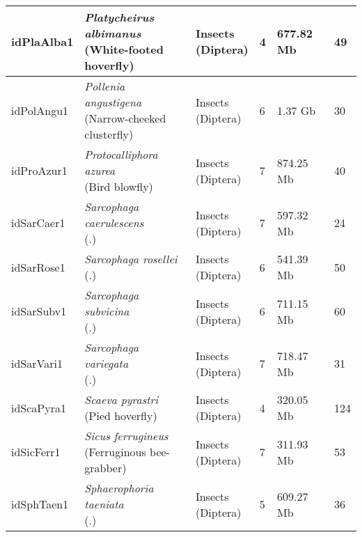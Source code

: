 \begin{centering}
\begin{longtable}{l|l|l|l|l|l}
idPlaAlba1 & \makecell[{l}]{\textit{Platycheirus albimanus} \\ (White-footed hoverfly)} & \makecell[{l}]{Insects \\ (Diptera)} & 4 & 677.82 Mb & 49  \\ \hline
idPolAngu1 & \makecell[{l}]{\textit{Pollenia angustigena} \\ (Narrow-cheeked clusterfly)} & \makecell[{l}]{Insects \\ (Diptera)} & 6 & 1.37 Gb & 30  \\ \hline
idProAzur1 & \makecell[{l}]{\textit{Protocalliphora azurea} \\ (Bird blowfly)} & \makecell[{l}]{Insects \\ (Diptera)} & 7 & 874.25 Mb & 40  \\ \hline
idSarCaer1 & \makecell[{l}]{\textit{Sarcophaga caerulescens} \\ (.)} & \makecell[{l}]{Insects \\ (Diptera)} & 7 & 597.32 Mb & 24  \\ \hline
idSarRose1 & \makecell[{l}]{\textit{Sarcophaga rosellei} \\ (.)} & \makecell[{l}]{Insects \\ (Diptera)} & 6 & 541.39 Mb & 50  \\ \hline
idSarSubv1 & \makecell[{l}]{\textit{Sarcophaga subvicina} \\ (.)} & \makecell[{l}]{Insects \\ (Diptera)} & 6 & 711.15 Mb & 60  \\ \hline
idSarVari1 & \makecell[{l}]{\textit{Sarcophaga variegata} \\ (.)} & \makecell[{l}]{Insects \\ (Diptera)} & 7 & 718.47 Mb & 31  \\ \hline
idScaPyra1 & \makecell[{l}]{\textit{Scaeva pyrastri} \\ (Pied hoverfly)} & \makecell[{l}]{Insects \\ (Diptera)} & 4 & 320.05 Mb & 124  \\ \hline
idSicFerr1 & \makecell[{l}]{\textit{Sicus ferrugineus} \\ (Ferruginous bee-grabber)} & \makecell[{l}]{Insects \\ (Diptera)} & 7 & 311.93 Mb & 53  \\ \hline
idSphTaen1 & \makecell[{l}]{\textit{Sphaerophoria taeniata} \\ (.)} & \makecell[{l}]{Insects \\ (Diptera)} & 5 & 609.27 Mb & 36  \\ \hline

\end{longtable}
\end{centering}
